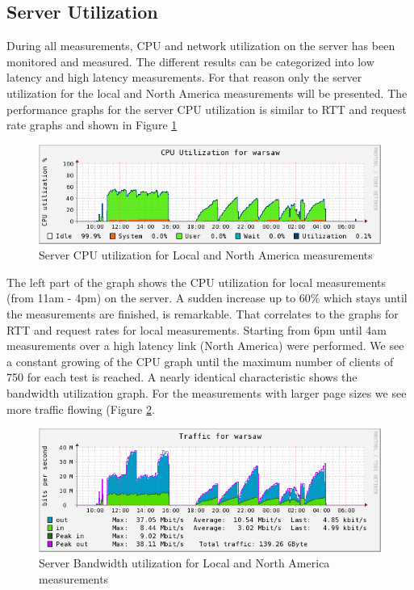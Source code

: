 \subsection{Server Utilization}
\label{subsec:server_util}

During all measurements, CPU and network utilization on the server has been monitored and measured. The different results can be categorized into low latency and high latency measurements. For that reason only the server utilization for the local and North America measurements will be presented. The performance graphs for the server CPU utilization is similar to RTT and request rate graphs and shown in Figure \ref{fig:cpu}   

\begin{figure}[H]
\centering
\includegraphics[scale=0.6,trim=0.0cm .0cm .0cm .0cm,clip]{images/cpu.png}
\caption{Server CPU utilization for Local and North America measurements}
\label{fig:cpu}
\end{figure}

The left part of the graph shows the CPU utilization for local measurements (from 11am - 4pm) on the server. A sudden increase up to 60\% which stays until the measurements are finished, is remarkable. That correlates to the graphs for RTT and request rates for local measurements. Starting from 6pm until 4am measurements over a high latency link (North America) were performed. We see a constant growing of the CPU graph until the maximum number of clients of 750 for each test is reached. A nearly identical characteristic shows the bandwidth utilization graph. For the measurements with larger page sizes we see more traffic flowing (Figure \ref{fig:network}.

\begin{figure}[H]
\centering
\includegraphics[scale=0.6,trim=0.0cm .0cm .0cm .0cm,clip]{images/network.png}
\caption{Server Bandwidth utilization for Local and North America measurements}
\label{fig:network}
\end{figure}

